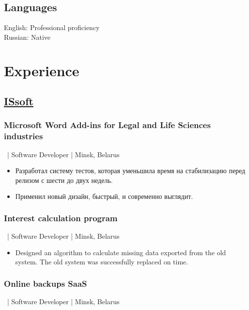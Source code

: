 \documentclass[a4paper]{article}
\begin{document}
\begin{minipage}[t]{0.39\textwidth}
    \subsection*{Languages}
    English: Professional proficiency\\
    Russian: Native

  \end{minipage}
  \begin{minipage}[t]{0.6\textwidth}

    \section*{Experience}
    \subsection*{\href{http://www.issoft.by/}{ISsoft}}
	\subsubsection*{Microsoft Word Add-ins for Legal and Life Sciences industries}
    \ | Software Developer | Minsk, Belarus
	\begin{otherlanguage}{russian}
      \begin{itemize}
        \item Разработал систему тестов, которая уменьшила время на стабилизацию перед релизом с шести до двух недель.
        \item Применил новый дизайн, быстрый, и современно выглядит.
      \end{itemize}
	\end{otherlanguage}
	
	\subsubsection*{Interest calculation program}
    \ | Software Developer | Minsk, Belarus
	\begin{itemize}
      \item Designed an algorithm to calculate missing data exported from the old system. The old system was successfully replaced on time.
    \end{itemize}

	\subsubsection*{Online backups SaaS}
	\ | Software Developer | Minsk, Belarus
	

\end{minipage}
\end{document}
